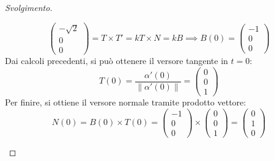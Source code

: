 \documentclass[12pt]{scrartcl}
\theoremstyle{style}
\newenvironment{svolgimento}{\renewcommand\qedsymbol{$\blacksquare$}\begin{proof}[Svolgimento]}{\end{proof}}
\numberwithin{equation}{subsection}
\begin{document}
\begin{svolgimento}
\begin{enumerate}[(a).]
		\[
		\begin{pmatrix} - \sqrt{2} \\0 \\0 \end{pmatrix} = T \times T' = k T \times N = k B \implies B(0) = \begin{pmatrix} -1 \\0 \\0  \end{pmatrix} 
		\] 
	Dai calcoli precedenti, si pu\`o ottenere il versore tangente in $t=0$:
	\[
	T(0) = \frac{\alpha '(0)}{\left\lVert \alpha '(0) \right\rVert } = \begin{pmatrix} 0 \\ 0 \\ 1 \end{pmatrix} 
	\] 
	Per finire, si ottiene il versore normale tramite prodotto vettore:
	\[
	N(0) = B(0) \times T(0) = \begin{pmatrix} -1 \\0 \\0 \end{pmatrix} \times \begin{pmatrix} 0\\0\\ 1 \end{pmatrix} = \begin{pmatrix} 0 \\ 1 \\0 \end{pmatrix} 
	\] 
	\end{enumerate}
\end{svolgimento}
\end{document}
